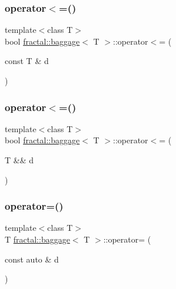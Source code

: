 \mbox{\label{classfractal_1_1baggage_ab76eb0939f7a13f39ee721c1be8579bf}} 
\subsubsection{\texorpdfstring{operator$<$=()}{operator<=()}\hspace{0.1cm}{\footnotesize\ttfamily [1/2]}}
{\footnotesize\ttfamily template$<$class T$>$ \\
bool \hyperlink{classfractal_1_1baggage}{fractal\+::baggage}$<$ T $>$\+::operator$<$= (\begin{DoxyParamCaption}\item[{const T \&}]{d }\end{DoxyParamCaption})\hspace{0.3cm}{\ttfamily [inline]}}

\mbox{\label{classfractal_1_1baggage_af153cc94c9ec942b1165486192797326}} 
\subsubsection{\texorpdfstring{operator$<$=()}{operator<=()}\hspace{0.1cm}{\footnotesize\ttfamily [2/2]}}
{\footnotesize\ttfamily template$<$class T$>$ \\
bool \hyperlink{classfractal_1_1baggage}{fractal\+::baggage}$<$ T $>$\+::operator$<$= (\begin{DoxyParamCaption}\item[{T \&\&}]{d }\end{DoxyParamCaption})\hspace{0.3cm}{\ttfamily [inline]}}

\mbox{\label{classfractal_1_1baggage_aa196967bae7105ee4f7b2609557e3843}} 
\subsubsection{\texorpdfstring{operator=()}{operator=()}\hspace{0.1cm}{\footnotesize\ttfamily [1/2]}}
{\footnotesize\ttfamily template$<$class T$>$ \\
T \hyperlink{classfractal_1_1baggage}{fractal\+::baggage}$<$ T $>$\+::operator= (\begin{DoxyParamCaption}\item[{const auto \&}]{d }\end{DoxyParamCaption})\hspace{0.3cm}{\ttfamily [inline]}}



